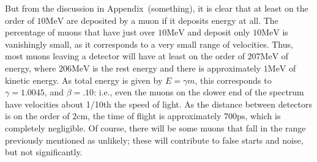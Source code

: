 But from the discussion in Appendix~(something), it is clear that at least on the order of $10 \mathrm{MeV}$ are deposited by a muon if it deposits energy at all. The percentage of muons that have just over $10 \mathrm{MeV}$ and deposit only $10 \mathrm{MeV}$ is vanishingly small, as it corresponds to a very small range of velocities. Thus, most muons leaving a detector will have at least on the order of $207 \mathrm{MeV}$ of energy, where $206 \mathrm{MeV}$ is the rest energy and there is approximately $1 \mathrm{MeV}$ of kinetic energy. As total energy is given by $E = \gamma m$, this corresponds to $\gamma = 1.0045$, and $\beta = .10$: i.e., even the muons on the slower end of the spectrum have velocities about 1/10th the speed of light. As the distance between detectors is on the order of $2 \mathrm{cm}$, the time of flight is approximately $700 \mathrm{ps}$, which is completely negligible. Of course, there will be some muons that fall in the range previously mentioned as unlikely; these will contribute to false starts and noise, but not significantly. 